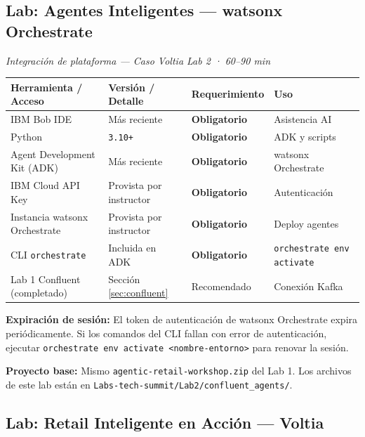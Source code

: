 \documentclass[11pt, a4paper]{article}
\newcommand{\version}[1]{\texttt{\textcolor{ibmblue}{#1}}}
\newcommand{\cmd}[1]{\texttt{\textcolor{ibmdark}{\small #1}}}
\newcommand{\req}[1]{\textbf{\textcolor{ibmred}{#1}}}
\begin{document}
\subsection{Lab: Agentes Inteligentes — watsonx Orchestrate}
\label{sec:wxo}

\textit{Integración de plataforma — Caso Voltia Lab 2 · 60--90 min}

\vspace{4pt}
\begin{tabular}{@{}llll@{}}
\toprule
\textbf{Herramienta / Acceso} & \textbf{Versión / Detalle} & \textbf{Requerimiento} & \textbf{Uso} \\
\midrule
IBM Bob IDE & Más reciente & \req{Obligatorio} & Asistencia AI \\
Python & \version{3.10+} & \req{Obligatorio} & ADK y scripts \\
Agent Development Kit (ADK) & Más reciente & \req{Obligatorio} & watsonx Orchestrate \\
IBM Cloud API Key & Provista por instructor & \req{Obligatorio} & Autenticación \\
Instancia watsonx Orchestrate & Provista por instructor & \req{Obligatorio} & Deploy agentes \\
CLI \texttt{orchestrate} & Incluida en ADK & \req{Obligatorio} & \cmd{orchestrate env activate} \\
Lab 1 Confluent (completado) & Sección \ref{sec:confluent} & Recomendado & Conexión Kafka \\
\bottomrule
\end{tabular}

\vspace{10pt}
\begin{warningbox}
  \textbf{Expiración de sesión:} El token de autenticación de watsonx Orchestrate expira periódicamente. Si los comandos del CLI fallan con error de autenticación, ejecutar \cmd{orchestrate env activate <nombre-entorno>} para renovar la sesión.
\end{warningbox}

\begin{infobox}
  \textbf{Proyecto base:} Mismo \texttt{agentic-retail-workshop.zip} del Lab 1. Los archivos de este lab están en \texttt{Labs-tech-summit/Lab2/confluent\_agents/}.
\end{infobox}

\subsection{Lab: Retail Inteligente en Acción — Voltia}
\label{sec:voltia}
\end{document}
